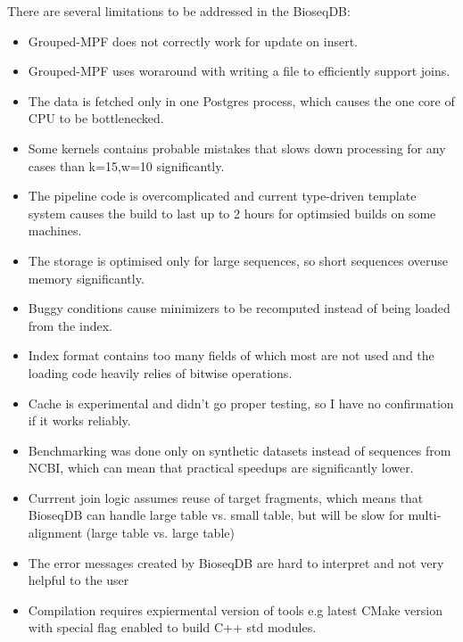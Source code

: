 \label{chap:conclusion}

There are several limitations to be addressed in the BioseqDB:
\begin{itemize}
    \item Grouped-MPF does not correctly work for update on insert.
    \item Grouped-MPF uses woraround with writing a file to efficiently support joins.
    \item The data is fetched only in one Postgres process, which causes the one core of CPU to be bottlenecked.
    \item Some kernels contains probable mistakes that slows down  processing for any cases than k=15,w=10 significantly.
    \item The pipeline code is overcomplicated and current type-driven template system causes the build to last up to 2 hours for optimsied builds on some machines.
    \item The storage is optimised only for large sequences, so short sequences overuse memory significantly.
    \item Buggy conditions cause minimizers to be recomputed instead of being loaded from the index.
    \item Index format contains too many fields of which most are not used and the loading code heavily relies of bitwise operations.
    \item Cache is experimental and didn't go proper testing, so I have no confirmation if it works reliably.
    \item Benchmarking was done only on synthetic datasets instead of sequences from NCBI, which can mean that practical speedups are significantly lower.
    \item Currrent join logic assumes reuse of target fragments, which means that BioseqDB can handle large table vs. small table, but will be slow for multi-alignment (large table vs. large table)
    \item The error messages created by BioseqDB are hard to interpret and not very helpful to the user
    \item Compilation requires expiermental version of tools e.g latest CMake version with special flag enabled to build C++ std modules.
\end{itemize}

